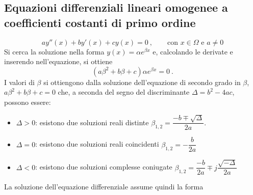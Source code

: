 \subsection{Equazioni differenziali lineari omogenee a coefficienti costanti di primo ordine}
\begin{equation}
  a y''(x) + b y'(x) + c y(x) = 0 \ , \qquad \text{con $x \in \Omega$ e  $a \ne 0$}
\end{equation}
Si cerca la soluzione nella forma $y(x) = \alpha e^{\beta x}$ e, calcolando le derivate e inserendo nell'equazione, si ottiene
\begin{equation}
  ( a \beta^2 + b \beta + c ) \alpha e^{\beta x} = 0 \ .
\end{equation}
I valori di $\beta$ si ottiengono dalla soluzione dell'equazione di secondo grado in $\beta$, $a \beta^2 + b \beta + c = 0$ che, a seconda del segno del discriminante $\Delta = b^2 - 4ac$, possono essere:
\begin{itemize}
    \item $\Delta > 0$: esistono due soluzioni reali distinte $\beta_{1,2} = \dfrac{-b\mp\sqrt{\Delta}}{2a}$.
    \item $\Delta = 0$: esistono due soluzioni reali coincidenti $\beta_{1,2} = -\dfrac{b}{2a}$
    \item $\Delta < 0$: esistono due soluzioni complesse coniugate $\beta_{1,2} = \dfrac{-b}{2a} \mp j \dfrac{\sqrt{-\Delta}}{2a}$
\end{itemize}
La soluzione dell'equazione differenziale assume quindi la forma
